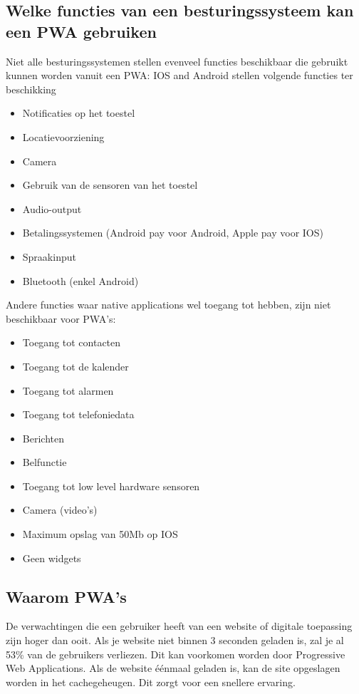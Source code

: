 \subsection{Welke functies van een besturingssysteem kan een PWA gebruiken}
Niet alle besturingssystemen stellen evenveel functies beschikbaar die gebruikt kunnen worden vanuit een PWA: IOS and Android stellen volgende functies ter beschikking
\begin{itemize}
    \item Notificaties op het toestel
    \item Locatievoorziening
    \item Camera
    \item Gebruik van de sensoren van het toestel
    \item Audio-output
    \item Betalingssystemen (Android pay voor Android, Apple pay voor IOS)
    \item Spraakinput
    \item Bluetooth (enkel Android)
\end{itemize}
Andere functies waar native applications wel toegang tot hebben, zijn niet beschikbaar voor PWA's:
\begin{itemize}
    \item Toegang tot contacten
    \item Toegang tot de kalender
    \item Toegang tot alarmen
    \item Toegang tot telefoniedata
    \item Berichten
    \item Belfunctie
    \item Toegang tot low level hardware sensoren
    \item Camera (video’s)
    \item Maximum opslag van 50Mb op IOS
    \item Geen widgets
\end{itemize}

\autocite{Malavolta2016}
\autocite{Destrebecq2018}

\subsection{Waarom PWA's}

De verwachtingen die een gebruiker heeft van een website of digitale toepassing zijn hoger dan ooit. Als je website niet binnen 3 seconden geladen is, zal je al 53\% van de gebruikers verliezen. Dit kan voorkomen worden door Progressive Web Applications. Als de website éénmaal geladen is, kan de site opgeslagen worden in het cachegeheugen. Dit zorgt voor een snellere ervaring.
\autocite{Google2017}

